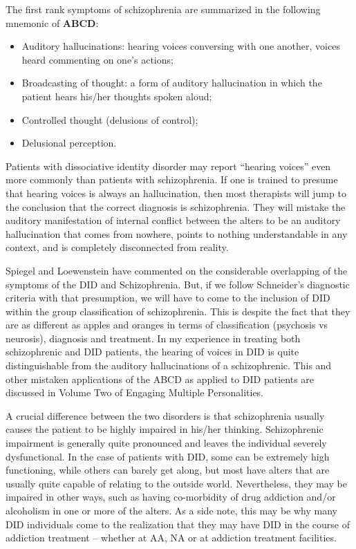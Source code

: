 \documentclass[]{book}
\begin{document}
The first rank symptoms of schizophrenia are summarized in the following mnemonic of \textbf{ABCD}:

\begin{itemize}
\item
  Auditory hallucinations: hearing voices conversing with one another, voices heard commenting on one's actions;
\item
  Broadcasting of thought: a form of auditory hallucination in which the patient hears his/her thoughts spoken aloud;
\item
  Controlled thought (delusions of control);
\item
  Delusional perception.
\end{itemize}

Patients with dissociative identity disorder may report ``hearing voices'' even more commonly than patients with schizophrenia. If one is trained to presume that hearing voices is always an hallucination, then most therapists will jump to the conclusion that the correct diagnosis is schizophrenia. They will mistake the auditory manifestation of internal conflict between the alters to be an auditory hallucination that comes from nowhere, points to nothing understandable in any context, and is completely disconnected from reality.

Spiegel and Loewenstein have commented on the considerable overlapping of the symptoms of the DID and Schizophrenia. But, if we follow Schneider's diagnostic criteria with that presumption, we will have to come to the inclusion of DID within the group classification of schizophrenia. This is despite the fact that they are as different as apples and oranges in terms of classification (psychosis vs neurosis), diagnosis and treatment.
In my experience in treating both schizophrenic and DID patients, the hearing of voices in DID is quite distinguishable from the auditory hallucinations of a schizophrenic. This and other mistaken applications of the ABCD as applied to DID patients are discussed in Volume Two of Engaging Multiple Personalities.

A crucial difference between the two disorders is that schizophrenia usually causes the patient to be highly impaired in his/her thinking. Schizophrenic impairment is generally quite pronounced and leaves the individual severely dysfunctional. In the case of patients with DID, some can be extremely high functioning, while others can barely get along, but most have alters that are usually quite capable of relating to the outside world. Nevertheless, they may be impaired in other ways, such as having co-morbidity of drug addiction and/or alcoholism in one or more of the alters. As a side note, this may be why many DID individuals come to the realization that they may have DID in the course of addiction treatment -- whether at AA, NA or at addiction treatment facilities.
\end{document}
